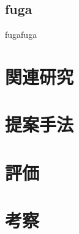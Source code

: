 \documentclass[uplatex,a4j,10pt]{jsarticle}
\begin{document}
\subsection{fuga}
fugafuga

\section{関連研究}

\section{提案手法}

\section{評価}

\section{考察}



\end{document}

